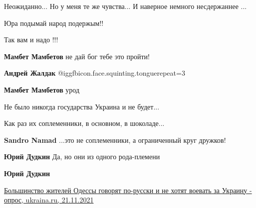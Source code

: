 \begin{itemize}
\begin{itemize}
\end{itemize} %

Неожиданно... Но у меня те же чувства... И наверное немного несдержаннее ...

Юра подымай народ подержым!!

Так вам и надо !!!

\begin{itemize} %
\textbf{Мамбет Мамбетов} не дай бог тебе это пройти!

\textbf{Андрей Жалдак}  @igg{fbicon.face.squinting.tongue}{repeat=3} 

\textbf{Мамбет Мамбетов} урод
\end{itemize} %

Не было никогда государства Украина и не будет...

Как раз их соплеменники, в основном, в шоколаде...

\begin{itemize} %
\textbf{Sandro Namad} ...это не соплеменники, а ограниченный круг дружков!

\textbf{Юрий Дудкин} Да, но они из одного рода-племени

\textbf{Юрий Дудкин}

\href{https://ukraina.ru/news/20211121/1032705618.html}{%
Большинство жителей Одессы говорят по-русски и не хотят воевать за Украину - опрос, ukraina.ru, 21.11.2021%
}

\end{itemize} %

\end{itemize} %
